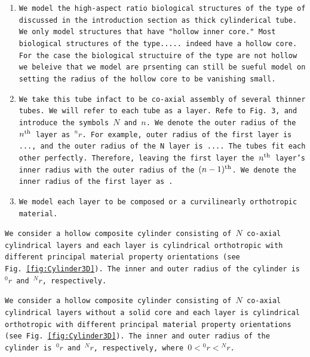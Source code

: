 \documentclass[preprint,12pt,times,draft]{elsarticle}
\numberwithin{equation}{section}
\renewcommand{\>}{$\Rightarrow$}
\begin{document}
\begin{enumerate}
  \item \texttt{We model the high-aspect ratio biological structures of the type of discussed in the introduction section as thick cylinderical tube. We only model structures that have "hollow inner core." Most biological structures of the type..... indeed have a hollow core. For the case the biological structuire of the type are not hollow we beleive that we model are prsenting can still be sueful model on setting the radius of the hollow core to be vanishing small.}

  \item \texttt{We take this tube infact to be co-axial assembly of several thinner tubes. We will refer to each tube as a layer. Refe to Fig. 3, and introduce the symbols $N$ and $n$. We denote the outer radius of the $n^{\rm th}$ layer as $^{n}r$. For example, outer radius of the first layer is ..., and the outer radius of the N layer is ....
  The tubes fit each other perfectly. Therefore, leaving the first layer the $n^{\rm th}$ layer's inner radius with the outer radius of the $(n-1)^{\rm th}$. We denote the inner radius of the first layer as .}

  \item \texttt{We model each layer to be composed or a curvilinearly orthotropic material.}

\end{enumerate}


\texttt{We consider a hollow composite cylinder consisting of~$N$ co-axial cylindrical layers and each layer is cylindrical orthotropic with different principal material property orientations (see Fig.~\ref{fig:Cylinder3D}). The inner and outer radius of the cylinder is~${}^{0}\!{r}$ and~${}^{N}\!{r}$, respectively.}

\texttt{We consider a hollow composite cylinder consisting of~$N$ co-axial cylindrical layers without a solid core and each layer is cylindrical orthotropic with different principal material property orientations (see Fig.~\ref{fig:Cylinder3D}). The inner and outer radius of the cylinder is~${}^{0}\!{r}$ and~${}^{N}\!{r}$, respectively, where $0 < {}^{0}\!{r}<{}^{N}\!{r}$.}
\end{document}
